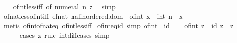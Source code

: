 \begin{isabellebody}
%
\isadelimproof
\ \ %
\endisadelimproof
%
\isatagproof
{}\isamarkupfalse%
\ of{\isacharunderscore}{\kern0pt}int{\isacharunderscore}{\kern0pt}less{\isacharunderscore}{\kern0pt}iff\ {\isacharbrackleft}{\kern0pt}of\ {\isachardoublequoteopen}numeral\ n{\isachardoublequoteclose}\ z{\isacharbrackright}{\kern0pt}\ \isamarkupfalse%
\ simp%
\endisatagproof
{\isafoldproof}%
%
\isadelimproof
\isanewline
%
\endisadelimproof
\isanewline
{}\isamarkupfalse%
\ of{\isacharunderscore}{\kern0pt}nat{\isacharunderscore}{\kern0pt}less{\isacharunderscore}{\kern0pt}of{\isacharunderscore}{\kern0pt}int{\isacharunderscore}{\kern0pt}iff{\isacharcolon}{\kern0pt}\ {\isachardoublequoteopen}{\isacharparenleft}{\kern0pt}of{\isacharunderscore}{\kern0pt}nat\ n{\isacharcolon}{\kern0pt}{\isacharcolon}{\kern0pt}{\isacharprime}{\kern0pt}a{\isacharcolon}{\kern0pt}{\isacharcolon}{\kern0pt}linordered{\isacharunderscore}{\kern0pt}idom{\isacharparenright}{\kern0pt}\ {\isacharless}{\kern0pt}\ of{\isacharunderscore}{\kern0pt}int\ x\ {\isasymlongleftrightarrow}\ int\ n\ {\isacharless}{\kern0pt}\ x{\isachardoublequoteclose}\isanewline
%
\isadelimproof
\ \ %
\endisadelimproof
%
\isatagproof
{}\isamarkupfalse%
\ {\isacharparenleft}{\kern0pt}metis\ of{\isacharunderscore}{\kern0pt}int{\isacharunderscore}{\kern0pt}of{\isacharunderscore}{\kern0pt}nat{\isacharunderscore}{\kern0pt}eq\ of{\isacharunderscore}{\kern0pt}int{\isacharunderscore}{\kern0pt}less{\isacharunderscore}{\kern0pt}iff{\isacharparenright}{\kern0pt}%
\endisatagproof
{\isafoldproof}%
%
\isadelimproof
\isanewline
%
\endisadelimproof
\isanewline
{}\isamarkupfalse%
\ of{\isacharunderscore}{\kern0pt}int{\isacharunderscore}{\kern0pt}eq{\isacharunderscore}{\kern0pt}id\ {\isacharbrackleft}{\kern0pt}simp{\isacharbrackright}{\kern0pt}{\isacharcolon}{\kern0pt}\ {\isachardoublequoteopen}of{\isacharunderscore}{\kern0pt}int\ {\isacharequal}{\kern0pt}\ id{\isachardoublequoteclose}\isanewline
%
\isadelimproof
%
\endisadelimproof
%
\isatagproof
{}\isamarkupfalse%
\isanewline
\ \ \isamarkupfalse%
\ {\isachardoublequoteopen}of{\isacharunderscore}{\kern0pt}int\ z\ {\isacharequal}{\kern0pt}\ id\ z{\isachardoublequoteclose}\ \ z\isanewline
\ \ \ \ \isamarkupfalse%
\ {\isacharparenleft}{\kern0pt}cases\ z\ rule{\isacharcolon}{\kern0pt}\ int{\isacharunderscore}{\kern0pt}diff{\isacharunderscore}{\kern0pt}cases{\isacharparenright}{\kern0pt}\ simp\isanewline
{}\isamarkupfalse%
%
\endisatagproof
{\isafoldproof}%
%
\isadelimproof

\end{isabellebody}
